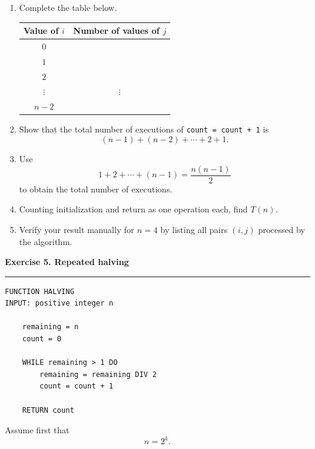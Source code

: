 \documentclass[11pt,a4paper]{article}
\newcommand{\exercise}[1]{%
  \vspace{0.7em}
  {\large\bfseries\color{ForestGreen}#1}
  \vspace{0.2em}
  \hrule
  \vspace{0.5em}
}
\begin{document}
\begin{enumerate}
    \item Complete the table below.

    \begin{center}
    \renewcommand{\arraystretch}{1.35}
    \begin{tabular}{c|c}
        \toprule
        Value of $i$ & Number of values of $j$ \\
        \midrule
        $0$ & \\
        $1$ & \\
        $2$ & \\
        $\vdots$ & $\vdots$ \\
        $n-2$ & \\
        \bottomrule
    \end{tabular}
    \end{center}

    \item Show that the total number of executions of
    \texttt{count = count + 1} is
    \[
        (n-1)+(n-2)+\cdots+2+1.
    \]

    \item Use
    \[
        1+2+\cdots+(n-1)=\frac{n(n-1)}{2}
    \]
    to obtain the total number of executions.

    \item Counting initialization and return as one operation each, find $T(n)$.

    \item Verify your result manually for $n=4$ by listing all pairs $(i,j)$ processed by the algorithm.
\end{enumerate}

\exercise{Exercise 5. Repeated halving}

\begin{lstlisting}[style=pseudo]
FUNCTION HALVING
INPUT: positive integer n

    remaining = n
    count = 0

    WHILE remaining > 1 DO
        remaining = remaining DIV 2
        count = count + 1

    RETURN count
\end{lstlisting}

Assume first that
\[
    n=2^k.
\]
\end{document}
